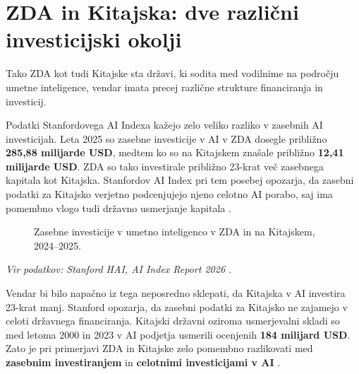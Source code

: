 \documentclass[12pt,a4paper]{article}
\begin{document}
\section{ZDA in Kitajska: dve različni investicijski okolji}

Tako ZDA kot tudi Kitajske sta državi, ki sodita med vodilnime na področju umetne inteligence, vendar imata precej različne strukture financiranja in investicij.

Podatki Stanfordovega AI Indexa kažejo zelo veliko razliko v zasebnih AI investicijah. Leta 2025 so zasebne investicije v AI v ZDA dosegle približno \textbf{285,88 milijarde USD}, medtem ko so na Kitajskem znašale približno \textbf{12,41 milijarde USD}. ZDA so tako investirale približno 23-krat več zasebnega kapitala kot Kitajska. Stanfordov AI Index pri tem posebej opozarja, da zasebni podatki za Kitajsko verjetno podcenjujejo njeno celotno AI porabo, saj ima pomembno vlogo tudi državno usmerjanje kapitala \citep{StanfordAIIndex2026}.

\begin{figure}[htbp]
\centering
{}
\caption{Zasebne investicije v umetno inteligenco v ZDA in na Kitajskem, 2024--2025.}
\label{fig:us_china_ai}
\end{figure}

\noindent
\textit{Vir podatkov: Stanford HAI, AI Index Report 2026 \citep{StanfordAIIndex2026}.}

Vendar bi bilo napačno iz tega neposredno sklepati, da Kitajska v AI investira 23-krat manj. Stanford opozarja, da zasebni podatki za Kitajsko ne zajamejo v celoti državnega financiranja. Kitajski državni oziroma usmerjevalni skladi so med letoma 2000 in 2023 v AI podjetja usmerili ocenjenih \textbf{184 milijard USD}. Zato je pri primerjavi ZDA in Kitajske zelo pomembno razlikovati med \textbf{zasebnim investiranjem} in \textbf{celotnimi investicijami v AI} \citep{StanfordAIIndex2026}.
\end{document}
